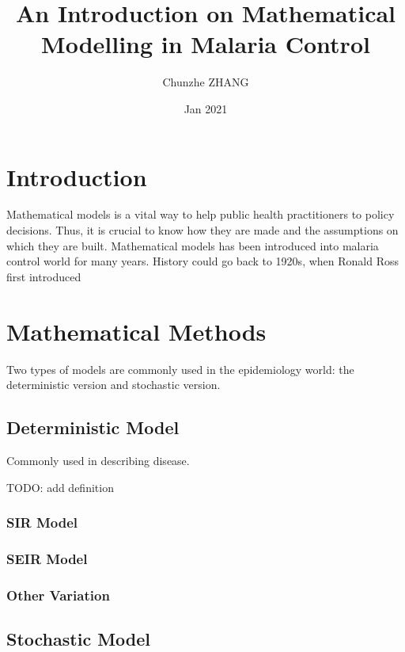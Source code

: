 \documentclass[a4paper, 12pt, twoside]{article}
\title{An Introduction on Mathematical Modelling in Malaria Control}
\author{Chunzhe ZHANG}
\date{Jan 2021}
\begin{document}
\begin{titlepage}
\maketitle
\end{titlepage}

\tableofcontents

\section{Introduction}
Mathematical models is a vital way to help public health practitioners to policy decisions. Thus, it is crucial to know how they are made and the assumptions on which they are built. Mathematical models has been introduced into malaria control world for many years. History could go back to 1920s, when Ronald Ross first introduced 

\section{Mathematical Methods}

Two types of models are commonly used in the epidemiology world: the deterministic version and stochastic version.

\subsection{Deterministic Model}

Commonly used in describing disease. 

TODO: add definition

\subsubsection{SIR Model}

\subsubsection{SEIR Model}

\subsubsection{Other Variation}

\subsection{Stochastic Model}
\end{document}

